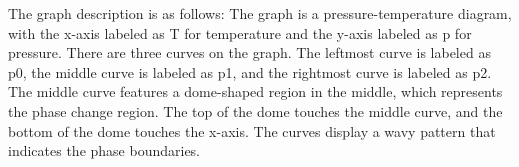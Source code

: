 The graph description is as follows: The graph is a pressure-temperature diagram, with the x-axis labeled as T for temperature and the y-axis labeled as p for pressure. There are three curves on the graph. The leftmost curve is labeled as p0, the middle curve is labeled as p1, and the rightmost curve is labeled as p2. The middle curve features a dome-shaped region in the middle, which represents the phase change region. The top of the dome touches the middle curve, and the bottom of the dome touches the x-axis. The curves display a wavy pattern that indicates the phase boundaries.